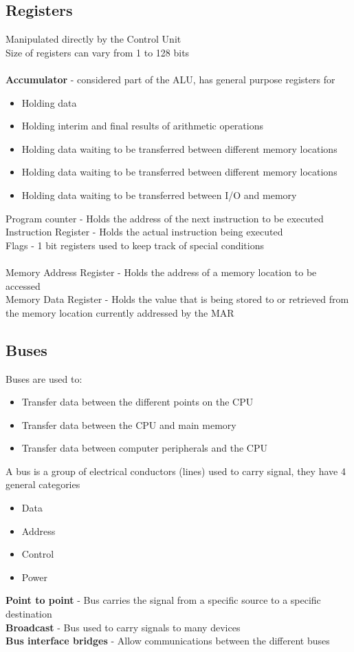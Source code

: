 \documentclass{article}[18pt]
\begin{document}
\subsection{Registers}
Manipulated directly by the Control Unit\\
Size of registers can vary from 1 to 128 bits\\
\\
\textbf{Accumulator} - considered part of the ALU, has general purpose registers for
\begin{itemize}
	\item Holding data
	\item Holding interim and final results of arithmetic operations
	\item Holding data waiting to be transferred between different memory locations
	\item Holding data waiting to be transferred between different memory locations
	\item Holding data waiting to be transferred between I/O and memory
\end{itemize}
Program counter - Holds the address of the next instruction to be executed\\
Instruction Register - Holds the actual instruction being executed\\
Flags - 1 bit registers used to keep track of special conditions\\
\\
Memory Address Register - Holds the address of a memory location to be accessed\\
Memory Data Register - Holds the value that is being stored to or retrieved from the memory location currently addressed by the MAR
\subsection{Buses}
Buses are used to:
\begin{itemize}
	\item Transfer data between the different points on the CPU
	\item Transfer data between the CPU and main memory
	\item Transfer data between computer peripherals and the CPU
\end{itemize} 
A bus is a group of electrical conductors (lines) used to carry signal, they have 4 general categories
\begin{itemize}
	\item Data
	\item Address
	\item Control
	\item Power
\end{itemize}
\textbf{Point to point} - Bus carries the signal from a specific source to a specific destination\\
\textbf{Broadcast} - Bus used to carry signals to many devices\\
\textbf{Bus interface bridges} - Allow communications between the different buses
\end{document}
